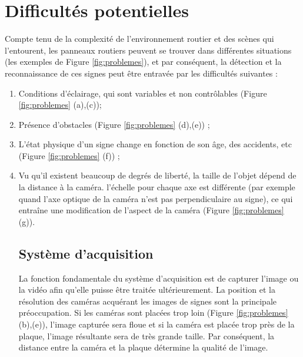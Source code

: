\section{Difficultés potentielles  }
Compte tenu de la complexité de l’environnement routier et des scènes qui l'entourent, les panneaux routiers peuvent se trouver dans différentes situations (les exemples de Figure \ref{fig:problemes}), et par conséquent, la détection et la reconnaissance de ces signes peut être entravée par les difficultés suivantes \cite{10} :
\begin{enumerate}
  \item Conditions d’éclairage, qui sont variables et non contrôlables (Figure \ref{fig:problemes} (a),(c));
  \item Présence d'obstacles (Figure \ref{fig:problemes} (d),(e)) ;
  \item L'état physique d'un signe change en fonction de son âge, des accidents, etc (Figure \ref{fig:problemes} (f)) ;
  \item Vu qu’il existent beaucoup de degrés de liberté, la taille de l'objet dépend de la distance à la caméra. l'échelle pour chaque axe est différente (par exemple quand l'axe optique de la caméra n'est pas perpendiculaire au signe), ce qui entraîne une modification de l'aspect de la caméra (Figure \ref{fig:problemes} (g)).
  
 \subsection{Système d'acquisition}
La fonction fondamentale du système d’acquisition est de capturer l'image ou la vidéo afin qu'elle puisse être traitée ultérieurement. La position et la résolution des caméras acquérant les images de signes sont la principale préoccupation. Si les caméras sont placées trop loin (Figure \ref{fig:problemes} (b),(e)), l'image capturée sera floue et si la caméra est placée trop près de la plaque, l'image résultante sera de très grande taille. Par conséquent, la distance entre la caméra et la plaque détermine la qualité de l'image.
 \end{enumerate}
 
